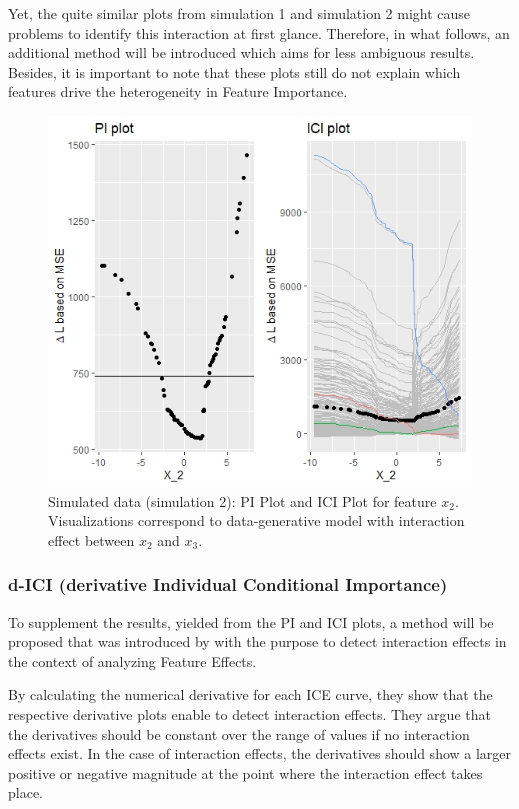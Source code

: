\documentclass[]{krantz}
\begin{document}
Yet, the quite similar plots from simulation 1 and simulation 2 might
cause problems to identify this interaction at first glance. Therefore,
in what follows, an additional method will be introduced which aims for
less ambiguous results. Besides, it is important to note that these
plots still do not explain which features drive the heterogeneity in
Feature Importance.

\begin{figure}

{\centering \includegraphics[width=0.99\linewidth]{images/03-7-2} 

}

\caption{Simulated data (simulation 2): PI Plot and ICI Plot for feature $x_{2}$. Visualizations correspond to data-generative model with interaction effect between $x_{2}$ and $x_{3}$.}\label{fig:fig2}
\end{figure}

\subsubsection{d-ICI (derivative Individual Conditional
Importance)}\label{ch312}

To supplement the results, yielded from the PI and ICI plots, a method
will be proposed that was introduced by \citet{Goldstein2013} with the
purpose to detect interaction effects in the context of analyzing
Feature Effects.

By calculating the numerical derivative for each ICE curve, they show
that the respective derivative plots enable to detect interaction
effects. They argue that the derivatives should be constant over the
range of values if no interaction effects exist. In the case of
interaction effects, the derivatives should show a larger positive or
negative magnitude at the point where the interaction effect takes
place.
\end{document}
